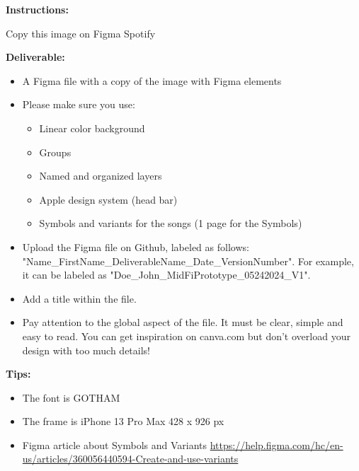\makeheaderfiles

\textbf{Instructions:}

Copy this image on Figma
Spotify

\textbf{Deliverable:}

\begin{itemize}
\item A Figma file with a copy of the image with Figma elements
\item Please make sure you use:
\begin{itemize}
\item Linear color background
\item Groups
\item Named and organized layers
\item Apple design system (head bar)
\item Symbols and variants for the songs (1 page for the Symbols)
\end{itemize}
\item Upload the Figma file on Github, labeled as follows: "Name\_FirstName\_DeliverableName\_Date\_VersionNumber". For example, it can be labeled as "Doe\_John\_MidFiPrototype\_05242024\_V1".
\item Add a title within the file.
\item Pay attention to the global aspect of the file. It must be clear, simple and easy to read. You can get inspiration on canva.com but don't overload your design with too much details!
\end{itemize}

\textbf{Tips:}

\begin{itemize}
\item The font is GOTHAM
\item The frame is iPhone 13 Pro Max 428 x 926 px
\item Figma article about Symbols and Variants \url{https://help.figma.com/hc/en-us/articles/360056440594-Create-and-use-variants}
\end{itemize}

